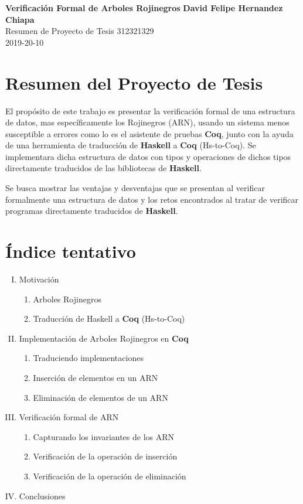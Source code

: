 \documentclass[letterpaper, 11pt]{article}
\begin{document}
\noindent
\large
\textbf{Verificación Formal de Arboles Rojinegros} \hfill 
\textbf{David Felipe Hernandez Chiapa} \\
\normalsize Resumen de Proyecto de Tesis       \hfill 312321329\\
                                               \hfill 2019-20-10 \\
\newcommand{\coq}{\textbf{Coq}}

\section*{Resumen del Proyecto de Tesis}
El propósito de este trabajo es presentar la verificación formal de una estructura de datos, 
mas específicamente los \Arboles Rojinegros (ARN), usando un sistema menos susceptible a errores
como lo es el asistente de pruebas \textbf{Coq}, junto con la ayuda de una herramienta de
traducción de \textbf{Haskell} a \textbf{Coq} (Hs-to-Coq). Se implementara dicha estructura de datos con 
tipos y operaciones de dichos tipos directamente traducidos de las bibliotecas de \textbf{Haskell}.

Se busca mostrar las ventajas y desventajas que se presentan al verificar formalmente una estructura
de datos y los retos encontrados al tratar de verificar programas directamente traducidos de \textbf{Haskell}.
\section*{Índice tentativo}
\begin{enumerate}[I.]
  \item Motivación
    \begin{enumerate}[1.]
     \item Arboles Rojinegros
     \item Traducción de Haskell a {\coq} (Hs-to-Coq)
    \end{enumerate}

  \item Implementación de Arboles Rojinegros en {\coq}
    \begin{enumerate}[1.]
      \item Traduciendo implementaciones
      \item Inserción de elementos en un ARN
      \item Eliminación de elementos de un ARN
    \end{enumerate}

  \item Verificación formal de ARN
    \begin{enumerate}[1.]
      \item Capturando los invariantes de los ARN
      \item Verificaci\'on de la operaci\'on de inserci\'on 
      \item Verificaci\'on de la operaci\'on de eliminaci\'on
    \end{enumerate}
    
  \item Conclusiones
\end{enumerate}
\end{document}
